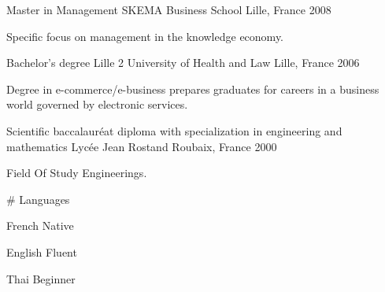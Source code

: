

\begin{cventries}

  \cventry
    {Master in Management} %
    {SKEMA Business School} %
    {Lille, France} %
    {2008} %
    {
      \begin{cvitems} %
        \item {Specific focus on management in the knowledge economy.}
      \end{cvitems}
    }
    { } %
  \cventry
    {Bachelor's degree} %
    {Lille 2 University of Health and Law} %
    {Lille, France} %
    {2006} %
    {
      \begin{cvitems} %
        \item {Degree in e-commerce/e-business prepares graduates for careers in a business world governed by electronic services.}
      \end{cvitems}
    }
    { } %
      \cventry
        {Scientific baccalauréat diploma with specialization in engineering and mathematics} %
        {Lycée Jean Rostand} %
        {Roubaix, France} %
        {2000} %
        {
          \begin{cvitems} %
            \item {Field Of Study Engineerings.}
          \end{cvitems}
        }
        { } %
  \cventry
    {} %
    {\# Languages} %
    { } %
    { } %
    {
      \begin{cvitems} %
        \item {French Native}
        \item {English Fluent}
        \item {Thai Beginner}
      \end{cvitems}
    }
    { } %

\end{cventries}
